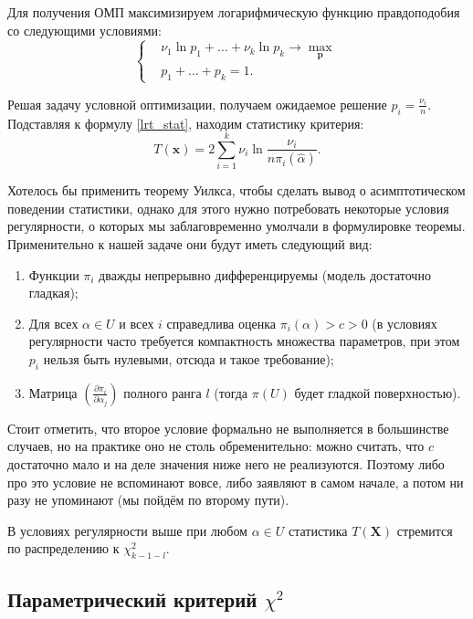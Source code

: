Для получения ОМП максимизируем логарифмическую функцию правдоподобия со следующими условиями:
\[
\left\{
\begin{aligned}
	&\nu_1 \ln{p_1} + \ldots + \nu_k \ln{p_k} \longrightarrow \max_{\mathbf p}\\
	&p_1 + \ldots + p_k = 1.
\end{aligned}\right.
\]

Решая задачу условной оптимизации, получаем ожидаемое решение $p_i = \frac{\nu_i}{n}$. Подставляя к формулу \eqref{lrt_stat}, находим статистику критерия:
\[
T(\mathbf x) = 2 \sum_{i=1}^k \nu_i \ln{\frac{\nu_i}{n \pi_i(\widehat{\alpha})}}.
\]

Хотелось бы применить теорему Уилкса, чтобы сделать вывод о асимптотическом поведении статистики, однако для этого нужно потребовать некоторые условия регулярности, о которых мы заблаговременно умолчали в формулировке теоремы. Применительно к нашей задаче они будут иметь следующий вид:
\begin{enumerate}
	\item Функции $\pi_i$ дважды непрерывно дифференцируемы (модель достаточно гладкая);
	\item Для всех $\alpha \in U$ и всех $i$ справедлива оценка $\pi_i(\alpha) > c > 0$ (в условиях регулярности часто требуется компактность множества параметров, при этом $p_i$ нельзя быть нулевыми, отсюда и такое требование);
	\item Матрица $\left(\frac{\partial \pi_i}{\partial \alpha_j}\right)$ полного ранга $l$ (тогда $\pi(U)$ будет гладкой поверхностью).
\end{enumerate} 
Стоит отметить, что второе условие формально не выполняется в большинстве случаев, но на практике оно не столь обременительно: можно считать, что $c$ достаточно мало и на деле значения ниже него не реализуются. Поэтому либо про это условие не вспоминают вовсе, либо заявляют в самом начале, а потом ни разу не упоминают (мы пойдём по второму пути).
\begin{theorem}{}{}
	В условиях регулярности выше при любом $\alpha \in U$ статистика $T(\mathbf X)$ стремится по распределению к $\chi^2_{k-1-l}$.
\end{theorem}

\subsection{Параметрический критерий $\chi^2$}\label{complext_chi2_test}

